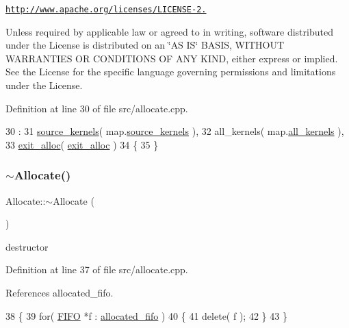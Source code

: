 \href{http://www.apache.org/licenses/LICENSE-2.0}{\tt http\+://www.\+apache.\+org/licenses/\+L\+I\+C\+E\+N\+S\+E-\/2.}

Unless required by applicable law or agreed to in writing, software distributed under the License is distributed on an \char`\"{}\+A\+S I\+S\char`\"{} B\+A\+S\+IS, W\+I\+T\+H\+O\+UT W\+A\+R\+R\+A\+N\+T\+I\+ES OR C\+O\+N\+D\+I\+T\+I\+O\+NS OF A\+NY K\+I\+ND, either express or implied. See the License for the specific language governing permissions and limitations under the License. 

Definition at line 30 of file src/allocate.\+cpp.


\begin{DoxyCode}
30                                                             :
31    \hyperlink{class_allocate_a93e612d7ea7eb686fc88b5dee7a1407b}{source\_kernels}( map.\hyperlink{class_map_base_a2541cb37a237e66fc88129f9f0b02f50}{source\_kernels} ),
32    all\_kernels(    map.\hyperlink{class_map_base_a2220cd630c5d00708f08d9bc70a48220}{all\_kernels} ),
33    \hyperlink{class_allocate_a4d10076b88ab1297c89b8a05e117b510}{exit\_alloc}( \hyperlink{class_allocate_a4d10076b88ab1297c89b8a05e117b510}{exit\_alloc} )
34 \{
35 \}
\end{DoxyCode}
\hypertarget{class_allocate_a68cd61da26f3b82da094b6d3e5d556f5}{}\label{class_allocate_a68cd61da26f3b82da094b6d3e5d556f5} 
\subsubsection{\texorpdfstring{$\sim$\+Allocate()}{~Allocate()}}
{\footnotesize\ttfamily Allocate\+::$\sim$\+Allocate (\begin{DoxyParamCaption}{ }\end{DoxyParamCaption})\hspace{0.3cm}{\ttfamily [virtual]}}

destructor 

Definition at line 37 of file src/allocate.\+cpp.



References allocated\+\_\+fifo.


\begin{DoxyCode}
38 \{
39    \textcolor{keywordflow}{for}( \hyperlink{class_f_i_f_o}{FIFO} *f : \hyperlink{class_allocate_a037410210c0d10578f87de1ec68f47ba}{allocated\_fifo} )
40    \{
41       \textcolor{keyword}{delete}( f );
42    \}
43 \}
\end{DoxyCode}


